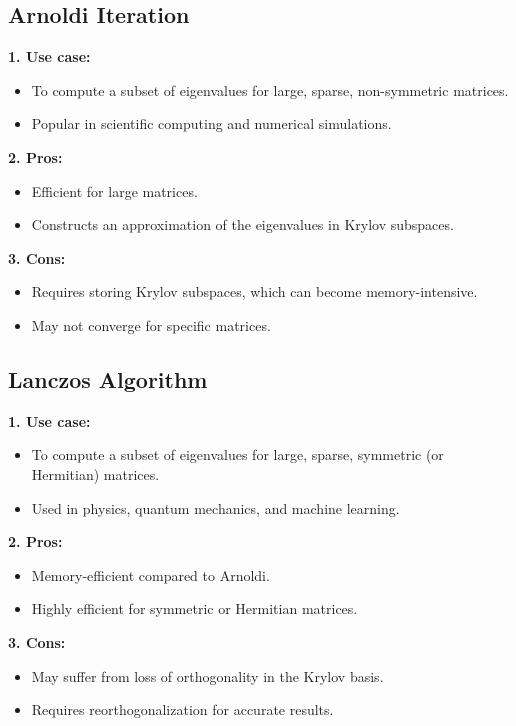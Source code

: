\documentclass{article}
\begin{document}
\subsection{Arnoldi Iteration}
\textbf{1. Use case:}
\begin{itemize}
    \item To compute a subset of eigenvalues for large, sparse, non-symmetric matrices.
    \item Popular in scientific computing and numerical simulations.
\end{itemize}
\textbf{2. Pros:}
\begin{itemize}
    \item Efficient for large matrices.
    \item Constructs an approximation of the eigenvalues in Krylov subspaces.    
\end{itemize}
\textbf{3. Cons:}
\begin{itemize}
    \item Requires storing Krylov subspaces, which can become memory-intensive.
    \item May not converge for specific matrices.
\end{itemize}
\subsection{Lanczos Algorithm}
\textbf{1. Use case:}
\begin{itemize}
    \item To compute a subset of eigenvalues for large, sparse, symmetric (or Hermitian) matrices.
    \item Used in physics, quantum mechanics, and machine learning.
\end{itemize}
\textbf{2. Pros:}
\begin{itemize}
    \item Memory-efficient compared to Arnoldi.
    \item Highly efficient for symmetric or Hermitian matrices.   
\end{itemize}
\textbf{3. Cons:}
\begin{itemize}
    \item May suffer from loss of orthogonality in the Krylov basis.
    \item Requires reorthogonalization for accurate results.
\end{itemize}
\end{document}
